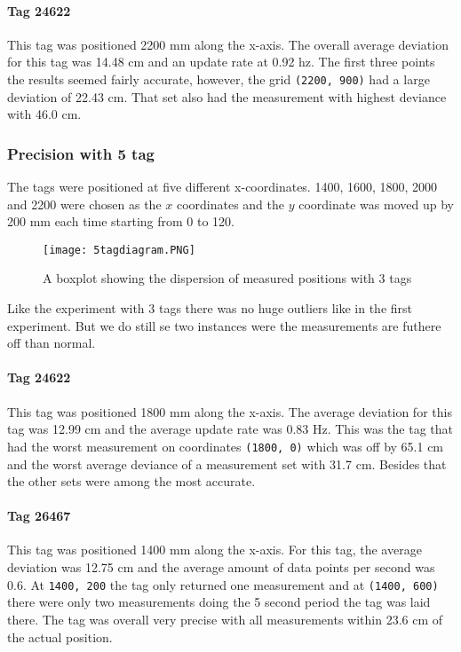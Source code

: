 \paragraph{Tag 24622}
This tag was positioned 2200 mm along the x-axis.
The overall average deviation for this tag was 14.48 cm and an update rate at 0.92 hz.
The first three points the results seemed fairly accurate, however, the grid \texttt{(2200, 900)} had a large deviation of 22.43 cm.
That set also had the measurement with highest deviance with 46.0 cm.

\subsubsection{Precision with 5 tag}
The tags were positioned at five different x-coordinates. 
1400, 1600, 1800, 2000 and 2200 were chosen as the $x$ coordinates and the $y$ coordinate was moved up by 200 mm each time starting from 0 to 120.
\begin{figure}[H]
    \centering
    \texttt{[image: 5tagdiagram.PNG]}
    \caption{A boxplot showing the dispersion of measured positions with 3 tags}
    \label{fig:5tagdiagram}
\end{figure}
\noindent
Like the experiment with 3 tags there was no huge outliers like in the first experiment.
But we do still se two instances were the measurements are futhere off than normal.


\paragraph{Tag 24622}
This tag was positioned 1800 mm along the x-axis.
The average deviation for this tag was 12.99 cm and the average update rate was 0.83 Hz.
This was the tag that had the worst measurement on coordinates \texttt{(1800, 0)} which was off by 65.1 cm and the worst average deviance of a measurement set with 31.7 cm.
Besides that the other sets were among the most accurate.

\paragraph{Tag 26467}
This tag was positioned 1400 mm along the x-axis.
For this tag, the average deviation was 12.75 cm and the average amount of data points per second was 0.6.
At \texttt{1400, 200} the tag only returned one measurement and at \texttt{(1400, 600)} there were only two measurements doing the 5 second period the tag was laid there.
The tag was overall very precise with all measurements within 23.6 cm of the actual position.

